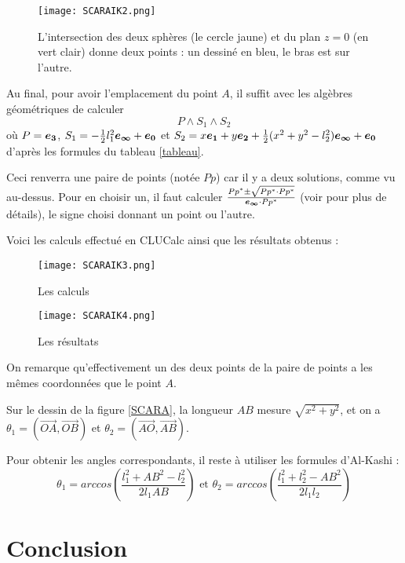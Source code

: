 \begin{figure}[!ht]
\centering
\texttt{[image: SCARAIK2.png]}
\caption{L'intersection des deux sphères (le cercle jaune) et du plan $z=0$ (en vert clair) donne deux points : un dessiné en bleu, le bras est sur l'autre.}
\end{figure}

Au final, pour avoir l'emplacement du point $A$, il suffit avec les algèbres géométriques de calculer $$P \wedge S_1 \wedge S_2$$
où $P=\bm{e_{3}}$, $S_1 = - \frac{1}{2}l_1^2\bm{e_{\infty}}+\bm{e_{0}}$ et $S_2 = x\bm{e_{1}}+y\bm{e_{2}} +\frac{1}{2}(x^2+ y^2-l_2^2)\bm{e_{\infty}}+\bm{e_{0}}$ d'après les formules du tableau \ref{tableau}.

Ceci renverra une paire de points (notée $Pp$) car il y a deux solutions, comme vu au-dessus. Pour en choisir un, il faut calculer $\frac{Pp^* \pm \sqrt{Pp^* \cdot Pp^*} }{\bm{e_{\infty}} \cdot Pp^*}$ (voir \cite{Dietmar} pour plus de détails), le signe choisi donnant un point ou l'autre. 

Voici les calculs effectué en CLUCalc ainsi que les résultats obtenus : \newpage

\begin{figure}[!ht]
    \begin{minipage}[c]{.46\linewidth}
        \centering
        \texttt{[image: SCARAIK3.png]}
        \caption{Les calculs}
    \end{minipage}
    \hfill%
    \begin{minipage}[c]{.46\linewidth}
        \centering
        \texttt{[image: SCARAIK4.png]}
        \caption{Les résultats}
    \end{minipage}
\end{figure}

On remarque qu'effectivement un des deux points de la paire de points a les mêmes coordonnées que le point $A$. 

Sur le dessin de la figure \ref{SCARA}, la longueur $AB$ mesure $\sqrt{x^2+y^2}$, et on a $\theta_1 = (\overrightarrow{OA}, \overrightarrow{OB})$ et $\theta_2 = (\overrightarrow{AO}, \overrightarrow{AB})$.

Pour obtenir les angles correspondants, il reste à utiliser les formules d'Al-Kashi :  $$\theta_1 = arccos \left(\frac{l_1^2+AB^2-l_2^2}{2 l_1 AB}\right)\text{ et }\theta_2 = arccos \left(\frac{l_1^2+l_2^2-AB^2}{2 l_1 l_2}\right)$$





\section{Conclusion}

